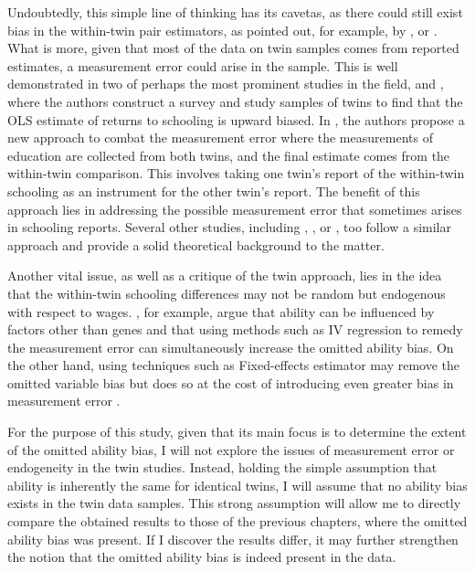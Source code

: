 Undoubtedly, this simple line of thinking has its cavetas, as there could still exist bias in the within-twin pair estimators, as pointed out, for example, by \cite{bound1999double}, or \cite{nakamuro2012estimating}. What is more, given that most of the data on twin samples comes from reported estimates, a measurement error could arise in the sample. This is well demonstrated in two of perhaps the most prominent studies in the field, \cite{ashenfelter1994estimates} and \cite{ashenfelter1998income}, where the authors construct a survey and study samples of twins to find that the \ac{OLS} estimate of returns to schooling is upward biased. In \cite{ashenfelter1994estimates}, the authors propose a new approach to combat the measurement error where the measurements of education are collected from both twins, and the final estimate comes from the within-twin comparison. This involves taking one twin's report of the within-twin schooling as an instrument for the other twin's report. The benefit of this approach lies in addressing the possible measurement error that sometimes arises in schooling reports. Several other studies, including \cite{behrman1994endowments}, \cite{isacsson1999estimates}, or \cite{bonjour2003returns}, too follow a similar approach and provide a solid theoretical background to the matter.

Another vital issue, as well as a critique of the twin approach, lies in the idea that the within-twin schooling differences may not be random but endogenous with respect to wages. \cite{bound1999double}, for example, argue that ability can be influenced by factors other than genes and that using methods such as \ac{IV} regression to remedy the measurement error can simultaneously increase the omitted ability bias. On the other hand, using techniques such as Fixed-effects estimator may remove the omitted variable bias but does so at the cost of introducing even greater bias in measurement error \citep{ning2005economic}.

For the purpose of this study, given that its main focus is to determine the extent of the omitted ability bias, I will not explore the issues of measurement error or endogeneity in the twin studies. Instead, holding the simple assumption that ability is inherently the same for identical twins, I will assume that no ability bias exists in the twin data samples. This strong assumption will allow me to directly compare the obtained results to those of the previous chapters, where the omitted ability bias was present. If I discover the results differ, it may further strengthen the notion that the omitted ability bias is indeed present in the data.


